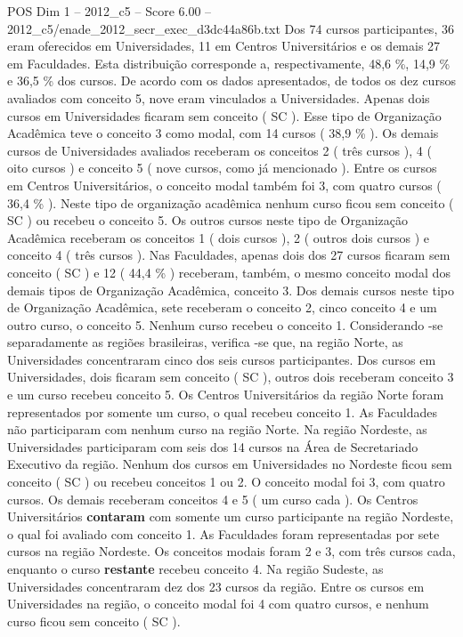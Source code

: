 \begin{textsample}{POS Dim 1 – 2012\_c5 – Score 6.00 – 2012\_c5/enade\_2012\_secr\_exec\_d3dc44a86b.txt}
Dos 74 cursos participantes, 36 eram oferecidos em Universidades, 11 em Centros Universitários e os demais 27 em Faculdades.
Esta distribuição corresponde a, respectivamente, 48,6 \%, 14,9 \% e 36,5 \% dos cursos.
De acordo com os dados apresentados, de todos os dez cursos avaliados com conceito 5, nove eram vinculados a Universidades.
Apenas dois cursos em Universidades ficaram sem conceito ( SC ).
Esse tipo de Organização Acadêmica teve o conceito 3 como modal, com 14 cursos ( 38,9 \% ).
Os demais cursos de Universidades avaliados receberam os conceitos 2 ( três cursos ), 4 ( oito cursos ) e conceito 5 ( nove cursos, como já mencionado ).
Entre os cursos em Centros Universitários, o conceito modal também foi 3, com quatro cursos ( 36,4 \% ).
Neste tipo de organização acadêmica nenhum curso ficou sem conceito ( SC ) ou recebeu o conceito 5.
Os outros cursos neste tipo de Organização Acadêmica receberam os conceitos 1 ( dois cursos ), 2 ( outros dois cursos ) e conceito 4 ( três cursos ).
Nas Faculdades, apenas dois dos 27 cursos ficaram sem conceito ( SC ) e 12 ( 44,4 \% ) receberam, também, o mesmo conceito modal dos demais tipos de Organização Acadêmica, conceito 3.
Dos demais cursos neste tipo de Organização Acadêmica, sete receberam o conceito 2, cinco conceito 4 e um outro curso, o conceito 5.
Nenhum curso recebeu o conceito 1.
Considerando -se separadamente as regiões brasileiras, verifica -se que, na região Norte, as Universidades concentraram cinco dos seis cursos participantes.
Dos cursos em Universidades, dois ficaram sem conceito ( SC ), outros dois receberam conceito 3 e um curso recebeu conceito 5.
Os Centros Universitários da região Norte foram representados por somente um curso, o qual recebeu conceito 1.
As Faculdades não participaram com nenhum curso na região Norte.
Na região Nordeste, as Universidades participaram com seis dos 14 cursos na Área de Secretariado Executivo da região.
Nenhum dos cursos em Universidades no Nordeste ficou sem conceito ( SC ) ou recebeu conceitos 1 ou 2.
O conceito modal foi 3, com quatro cursos.
Os demais receberam conceitos 4 e 5 ( um curso cada ).
Os Centros Universitários \textbf{contaram} com somente um curso participante na região Nordeste, o qual foi avaliado com conceito 1.
As Faculdades foram representadas por sete cursos na região Nordeste.
Os conceitos modais foram 2 e 3, com três cursos cada, enquanto o curso \textbf{restante} recebeu conceito 4.
Na região Sudeste, as Universidades concentraram dez dos 23 cursos da região.
Entre os cursos em Universidades na região, o conceito modal foi 4 com quatro cursos, e nenhum curso ficou sem conceito ( SC ).

\end{textsample}
